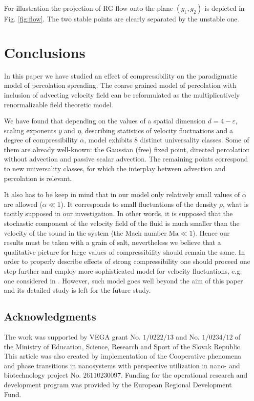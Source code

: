 \documentclass[aps,pre,url,twocolumn,superscriptaddress]{revtex4-1}
\def\eps{\varepsilon}
\begin{document}
For illustration the projection of RG flow onto the plane $(g_1,g_2)$ is
depicted in Fig. \ref{fig:flow}. The two stable points are clearly separated
by the unstable one.

\section{Conclusions\label{sec:concl}}
In this paper we have studied an effect of compressibility on the paradigmatic model
of percolation spreading. The coarse grained model of percolation with
inclusion of advecting velocity field can be reformulated as the multiplicatively
renormalizable field theoretic model. 

We have found that depending on the values of a spatial dimension $d=4-\eps$, scaling
exponents $y$ and $\eta$, describing statistics of velocity fluctuations and
a degree of compressibility $\alpha$, model exhibits $8$ distinct universality classes.
Some of them are already well-known: the Gaussian (free) fixed point,
directed percolation without advection and passive scalar advection. The remaining
 points correspond to new universality classes, for which the interplay
between advection and percolation is relevant.

It also has to be keep in mind that in our model only relatively small values of
$\alpha$ are allowed ($\alpha \ll 1$). It corresponds to small fluctuations of the density 
$\rho$, what is tacitly supposed in our investigation. In other words, it is supposed that the
stochastic component of the velocity field of the fluid is much smaller than the velocity
of the sound in the system (the Mach number $\mathrm{Ma} \ll 1$).
Hence our results must be taken
with a grain of salt, nevertheless we believe that a qualitative picture for
large values of compressibility should remain the same.
In order to properly
describe effects of strong compressibility one should proceed one step further
and employ more sophisticated model for velocity fluctuations, e.g. one
considered in \cite{AntKos14}. However, such model goes
well beyond the aim of this paper and its detailed study is left for the future study.

\subsection*{Acknowledgments}
The work was supported by VEGA grant No. $1/0222/13$ and No. $1/0234/12$
 of the Ministry of Education, Science, Research and Sport of the Slovak Republic. This article was also
created by implementation of the Cooperative phenomena and phase transitions
in nanosystems with perspective utilization in nano- and biotechnology project No.
$26110230097$. Funding for the operational research and development program was
provided by the European Regional Development Fund.
\appendix
\end{document}
